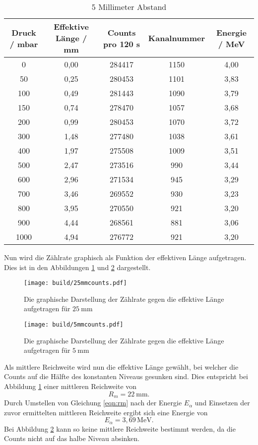 \begin{table}
  \centering
  \caption{5 Millimeter Abstand}
  \label{tab:5mm}
  \begin{tabular}{c c c c c}
    \toprule
     Druck / \si{\milli\bar} & Effektive Länge / \si{\milli\metre} & Counts pro 120 \si{\second} & Kanalnummer & Energie / \si{\mega\electronvolt}\\
    \midrule
    0   & 0,00 & 284417 & 1150 & 4,00 \\
    50  & 0,25 & 280453 & 1101 & 3,83 \\
    100 & 0,49 & 281443 & 1090 & 3,79 \\
    150 & 0,74 & 278470 & 1057 & 3,68 \\
    200 & 0,99 & 280453 & 1070 & 3,72 \\
    300 & 1,48 & 277480 & 1038 & 3,61 \\
    400 & 1,97 & 275508 & 1009 & 3,51 \\
    500 & 2,47 & 273516 &  990 & 3,44 \\
    600 & 2,96 & 271534 &  945 & 3,29 \\
    700 & 3,46 & 269552 &  930 & 3,23 \\
    800 & 3,95 & 270550 &  921 & 3,20 \\
    900 & 4,44 & 268561 &  881 & 3,06 \\
    1000& 4,94 & 276772 &  921 & 3,20 \\
    \bottomrule
  \end{tabular}
\end{table}
\FloatBarrier
Nun wird die Zählrate graphisch als Funktion der effektiven Länge aufgetragen.
Dies ist in den Abbildungen \ref{fig:25mmcounts} und \ref{fig:5mmcounts} dargestellt.
\FloatBarrier
\begin{figure}
    \centering
    \texttt{[image: build/25mmcounts.pdf]}
    \caption{Die graphische Darstellung der Zählrate gegen die effektive Länge aufgetragen für $\SI{25}{\milli\metre}$}
    \label{fig:25mmcounts}
\end{figure}

\begin{figure}
    \centering
    \texttt{[image: build/5mmcounts.pdf]}
  \caption{Die graphische Darstellung der Zählrate gegen die effektive Länge aufgetragen für $\SI{5}{\milli\metre}$}
  \label{fig:5mmcounts}
\end{figure}
\FloatBarrier
Als mittlere Reichweite wird nun die effektive Länge gewählt, bei welcher die Counts auf die Hälfte des konstanten Niveaus gesunken sind.
Dies entspricht bei Abbildung \ref{fig:25mmcounts} einer mittleren Reichweite von
\begin{equation*}
  R_m = 22 \: \si{\milli\metre}.
 \end{equation*}
Durch Umstellen von Gleichung \ref{eqn:rm} nach der Energie $E_{\alpha}$ und Einsetzen der zuvor ermittelten mittleren Reichweite ergibt sich eine
Energie von
\begin{equation*}
  E_{\alpha} = 3,69 \, \si{\mega\electronvolt}.
\end{equation*}
Bei Abbildung \ref{fig:5mmcounts} kann so keine mittlere Reichweite bestimmt werden, da die Counts nicht auf das halbe Niveau absinken.

